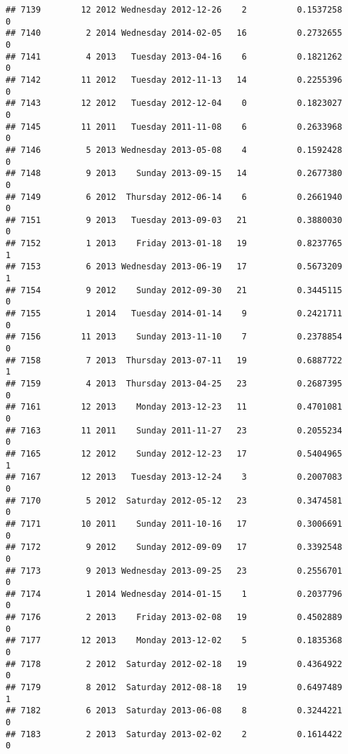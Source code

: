 \documentclass[
]{article}
\begin{document}
\begin{verbatim}
## 7139        12 2012 Wednesday 2012-12-26    2          0.1537258             0
## 7140         2 2014 Wednesday 2014-02-05   16          0.2732655             0
## 7141         4 2013   Tuesday 2013-04-16    6          0.1821262             0
## 7142        11 2012   Tuesday 2012-11-13   14          0.2255396             0
## 7143        12 2012   Tuesday 2012-12-04    0          0.1823027             0
## 7145        11 2011   Tuesday 2011-11-08    6          0.2633968             0
## 7146         5 2013 Wednesday 2013-05-08    4          0.1592428             0
## 7148         9 2013    Sunday 2013-09-15   14          0.2677380             0
## 7149         6 2012  Thursday 2012-06-14    6          0.2661940             0
## 7151         9 2013   Tuesday 2013-09-03   21          0.3880030             0
## 7152         1 2013    Friday 2013-01-18   19          0.8237765             1
## 7153         6 2013 Wednesday 2013-06-19   17          0.5673209             1
## 7154         9 2012    Sunday 2012-09-30   21          0.3445115             0
## 7155         1 2014   Tuesday 2014-01-14    9          0.2421711             0
## 7156        11 2013    Sunday 2013-11-10    7          0.2378854             0
## 7158         7 2013  Thursday 2013-07-11   19          0.6887722             1
## 7159         4 2013  Thursday 2013-04-25   23          0.2687395             0
## 7161        12 2013    Monday 2013-12-23   11          0.4701081             0
## 7163        11 2011    Sunday 2011-11-27   23          0.2055234             0
## 7165        12 2012    Sunday 2012-12-23   17          0.5404965             1
## 7167        12 2013   Tuesday 2013-12-24    3          0.2007083             0
## 7170         5 2012  Saturday 2012-05-12   23          0.3474581             0
## 7171        10 2011    Sunday 2011-10-16   17          0.3006691             0
## 7172         9 2012    Sunday 2012-09-09   17          0.3392548             0
## 7173         9 2013 Wednesday 2013-09-25   23          0.2556701             0
## 7174         1 2014 Wednesday 2014-01-15    1          0.2037796             0
## 7176         2 2013    Friday 2013-02-08   19          0.4502889             0
## 7177        12 2013    Monday 2013-12-02    5          0.1835368             0
## 7178         2 2012  Saturday 2012-02-18   19          0.4364922             0
## 7179         8 2012  Saturday 2012-08-18   19          0.6497489             1
## 7182         6 2013  Saturday 2013-06-08    8          0.3244221             0
## 7183         2 2013  Saturday 2013-02-02    2          0.1614422             0

\end{verbatim}
\end{document}
